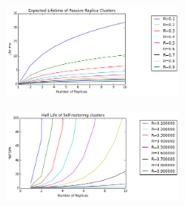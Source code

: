 \documentclass[conference]{IEEEtran}
\begin{document}
\begin{figure}[h]
	\includegraphics[width=0.5\textwidth]{figs/lifetime}
\end{figure}
\begin{figure}[h]
	\includegraphics[width=0.5\textwidth]{figs/self_healing}
\end{figure}



\end{document}
